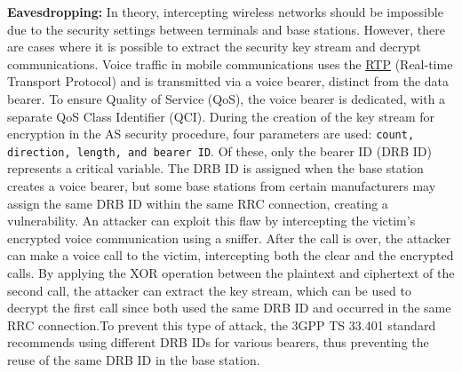 \documentclass[english]{article}
\begin{document}
\textbf{Eavesdropping:}
In theory, intercepting wireless networks should be impossible due to
the security settings between terminals and base stations. However, there
are cases where it is possible to extract the security key stream and decrypt
communications. Voice traffic in mobile communications uses the \hyperlink{RTP}{RTP}
(Real-time Transport Protocol) and is transmitted via a voice bearer, distinct from
the data bearer. To ensure Quality of Service (QoS), the voice bearer is dedicated,
with a separate QoS Class Identifier (QCI). During the creation of the key stream
for encryption in the AS security procedure, four parameters are used:
\texttt{count, direction, length, and bearer ID}. Of these, only the bearer
ID (DRB ID) represents a critical variable. The DRB ID is assigned when the base
station creates a voice bearer, but some base stations from certain manufacturers
may assign the same DRB ID within the same RRC connection, creating a vulnerability.
An attacker can exploit this flaw by intercepting the victim's encrypted voice
communication using a sniffer. After the call is over, the attacker can make a voice
call to the victim, intercepting both the clear and the encrypted calls. By applying
the XOR operation between the plaintext and ciphertext of the second call, the
attacker can extract the key stream, which can be used to decrypt the first call
since both used the same DRB ID and occurred in the same RRC connection.\@ To prevent
this type of attack, the 3GPP TS 33.401 standard recommends using different DRB IDs for
various bearers, thus preventing the reuse of the same DRB ID in the base station.
\\[0.2cm]
\end{document}
